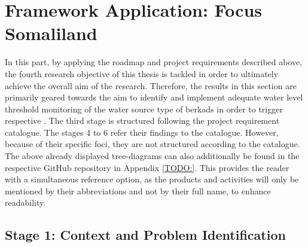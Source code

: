 
\pagebreak


\section{Framework Application: Focus Somaliland}\label{sec:f_a}

In this part, by applying the roadmap and project requirements described above, the fourth research objective of this thesis is tackled in order to ultimately achieve the overall aim of the research. Therefore, the results in this section are primarily geared towards the aim to identify and implement adequate water level threshold monitoring of the water source type of berkads in order to trigger respective . The third stage is structured following the project requirement catalogue. The stages 4 to 6 refer their findings to the catalogue. However, because of their specific foci, they are not structured according to the catalogue. The above already displayed tree-diagrams can also additionally be found in the respective GitHub repository in Appendix \ref*{TODO:}. This provides the reader with a simultaneous reference option, as the products and activities will only be mentioned by their abbreviations and not by their full name, to enhance readability.

\subsection{Stage 1: Context and Problem Identification}\label{subsec:stage1_appl}

